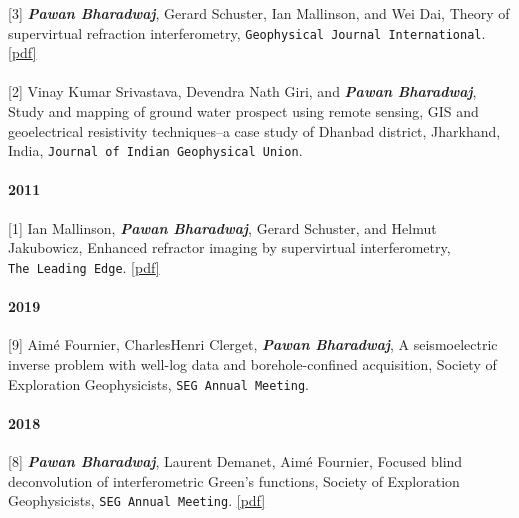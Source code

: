 \documentclass[9pt]{developercv} %
\begin{document}
{[}3{]}
\textbf{\emph{Pawan
Bharadwaj}},
Gerard
Schuster,
Ian
Mallinson,
and Wei
Dai,
Theory of
supervirtual
refraction
interferometry,
\texttt{Geophysical\ Journal\ International}.
\href{https://github.com/pawbz/pawbz.github.io/blob/src/pdf/papers/svi_GJI1.pdf}{{[}pdf{]}}

\paragraph{}\label{section-25}

{[}2{]}
Vinay
Kumar
Srivastava,
Devendra
Nath Giri,
and
\textbf{\emph{Pawan
Bharadwaj}},
Study and
mapping of
ground
water
prospect
using
remote
sensing,
GIS and
geoelectrical
resistivity
techniques--a
case study
of Dhanbad
district,
Jharkhand,
India,
\texttt{Journal\ of\ Indian\ Geophysical\ Union}.

\paragraph{2011}\label{section-26}

{[}1{]}
Ian
Mallinson,
\textbf{\emph{Pawan
Bharadwaj}},
Gerard
Schuster,
and Helmut
Jakubowicz,
Enhanced
refractor
imaging by
supervirtual
interferometry,
\texttt{The\ Leading\ Edge}.
\href{https://github.com/pawbz/pawbz.github.io/blob/src/pdf/papers/svi_TLE.pdf}{{[}pdf{]}}

\label{peer-reviewed-conference-articles-presentations}

\paragraph{2019}\label{section-27}

{[}9{]}
Aimé
Fournier,
Charles­Henri
Clerget,
\textbf{\emph{Pawan
Bharadwaj}},
A
seismoelectric
inverse
problem
with
well-log
data and
borehole-confined
acquisition,
Society of
Exploration
Geophysicists,
\texttt{SEG\ Annual\ Meeting}.

\paragraph{2018}\label{section-28}

{[}8{]}
\textbf{\emph{Pawan
Bharadwaj}},
Laurent
Demanet,
Aimé
Fournier,
Focused
blind
deconvolution
of
interferometric
Green's
functions,
Society of
Exploration
Geophysicists,
\texttt{SEG\ Annual\ Meeting}.
\href{https://github.com/pawbz/pawbz.github.io/blob/src/pdf/abstracts/Pawan_FIBD_SEG.pdf}{{[}pdf{]}}
\end{document}
